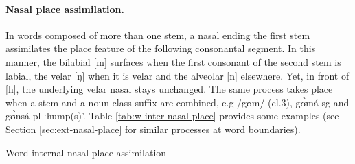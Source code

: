 \paragraph{Nasal place assimilation.}
\label{sec:internal-sandhi-nasal-place}

In words composed of more than one stem, a nasal ending the first stem  assimilates the  place feature of the following consonantal segment. In this manner,  the bilabial [{m}] surfaces when  the first consonant of the second stem is {\sc labial}, the velar  [{ŋ}] when it is {\sc velar}  and  the alveolar [{n}] elsewhere. Yet, in front of [{h}], the underlying velar nasal stays unchanged. The same process takes place when a stem and a noun class suffix are combined, e.g /{\sls gʊm}/  ({\sc cl.3}),  {\sls gʊ̀má} {\sc sg}  and  {\sls gʊ̀nsá} {\sc pl} `hump(s)'. Table \ref{tab:w-inter-nasal-place} provides some examples (see Section
\ref{sec:ext-nasal-place} for similar processes at word boundaries).




\begin{table}[!htp]

 
 \caption{Word-internal nasal place assimilation 
\label{tab:w-inter-nasal-place}}
\end{table}


